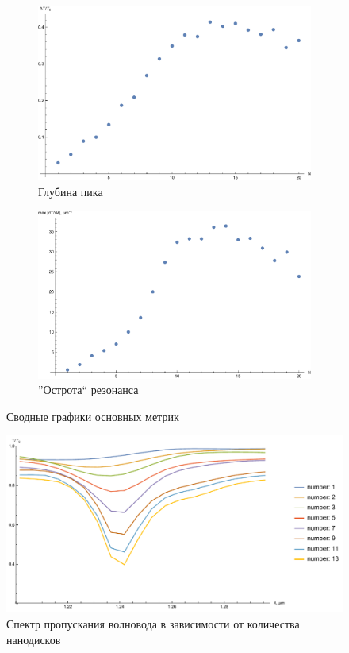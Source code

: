 \begin{figure}[h]
	\begin{subfigure}[b]{.5\textwidth}
		\includegraphics[width=\textwidth]{img/dTPlot}
		\caption{Глубина пика}
		\label{fig:metrics_dT}
	\end{subfigure}
	\begin{subfigure}[b]{.5\textwidth}
		\includegraphics[width=\textwidth]{img/dTdλPlot}
		\caption{''Острота`` резонанса}
		\label{fig:metrics_dTdLambda}
	\end{subfigure}
	\caption{Сводные графики основных метрик}
	\label{fig:metrics}
\end{figure}

\begin{figure}[h]
	\includegraphics[width=\textwidth]{img/total}
	\caption{Спектр пропускания волновода в зависимости от количества нанодисков}
	\label{fig:Nx_fixed_r_fixed_d}
\end{figure}

